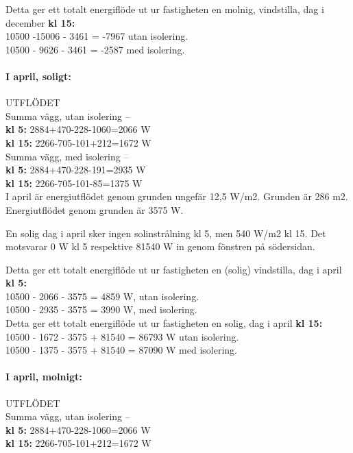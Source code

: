 Detta ger ett totalt energiflöde ut ur fastigheten en molnig, vindstilla, dag i december \textbf{kl 15:}\\
10500 -15006 - 3461 = -7967 utan isolering.\\
10500 - 9626 - 3461 = -2587 med isolering.\\


\paragraph{I april, soligt:}
UTFLÖDET\\
Summa vägg, utan isolering –\\
\textbf{kl 5:} 2884+470-228-1060=2066 W\\
\textbf{kl 15:} 2266-705-101+212=1672 W\\

Summa vägg, med isolering –\\
\textbf{kl 5:} 2884+470-228-191=2935 W\\
\textbf{kl 15:} 2266-705-101-85=1375 W\\

I april är energiutflödet genom grunden ungefär 12,5 W/m2. Grunden är 286 m2.\\
Energiutflödet genom grunden är 3575 W.

En solig dag i april sker ingen solinstrålning kl 5, men 540 W/m2 kl 15. Det motsvarar 0 W kl 5 respektive 81540 W in genom fönstren på södersidan.

Detta ger ett totalt energiflöde ut ur fastigheten en (solig) vindstilla, dag i april \textbf{kl 5:}\\
10500 - 2066 - 3575 =  4859 W, utan isolering.\\
10500 - 2935 - 3575 =  3990 W, med isolering.\\

Detta ger ett totalt energiflöde ut ur fastigheten en solig, dag i april \textbf{kl 15:}\\
10500 - 1672 - 3575 + 81540 = 86793 W utan isolering.\\
10500 - 1375 - 3575 + 81540  =  87090 W med isolering.\\



\paragraph{I april, molnigt:}
UTFLÖDET\\
Summa vägg, utan isolering –\\
\textbf{kl 5:} 2884+470-228-1060=2066 W\\
\textbf{kl 15:} 2266-705-101+212=1672 W\\

